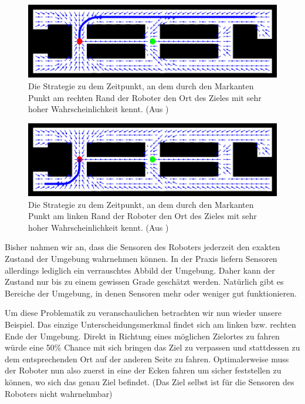 \documentclass[a4paper]{IEEEtran}
\begin{document}
\begin{figure}[ht]
	\centering
	\includegraphics[scale=0.72]{images/autnmRobot_POMDPPathB.png}
	\caption{Die Strategie zu dem Zeitpunkt, an dem durch den Markanten Punkt am rechten Rand der Roboter den Ort des Zieles mit sehr hoher Wahrscheinlichkeit kennt. (Aus \cite{thrun2005probabilistic})}
	\label{autnmRobot_POMDPPathB}
\end{figure}

\begin{figure}[ht]
	\centering
	\includegraphics[scale=0.72]{images/autnmRobot_POMDPPathC.png}
	\caption{Die Strategie zu dem Zeitpunkt, an dem durch den Markanten Punkt am linken Rand der Roboter den Ort des Zieles mit sehr hoher Wahrscheinlichkeit kennt. (Aus \cite{thrun2005probabilistic})}
	\label{autnmRobot_POMDPPathC}
\end{figure}

Bisher nahmen wir an, dass die Sensoren des Roboters jederzeit den exakten Zustand der Umgebung wahrnehmen können. In der Praxis liefern Sensoren allerdings lediglich ein verrauschtes Abbild der Umgebung. Daher kann der Zustand nur bis zu einem gewissen Grade geschätzt werden. Natürlich gibt es Bereiche der Umgebung, in denen Sensoren mehr oder weniger gut funktionieren.

Um diese Problematik zu veranschaulichen betrachten wir nun wieder unsere Beispiel. Das einzige Unterscheidungsmerkmal findet sich am linken bzw. rechten Ende der Umgebung. Direkt in Richtung eines möglichen Zielortes zu fahren würde eine 50\% Chance mit sich bringen das Ziel zu verpassen und stattdessen zu dem entsprechenden Ort auf der anderen Seite zu fahren. Optimalerweise muss der Roboter nun also zuerst in eine der Ecken fahren um sicher feststellen zu können, wo sich das genau Ziel befindet. (Das Ziel selbst ist für die Sensoren des Roboters nicht wahrnehmbar)
\end{document}
